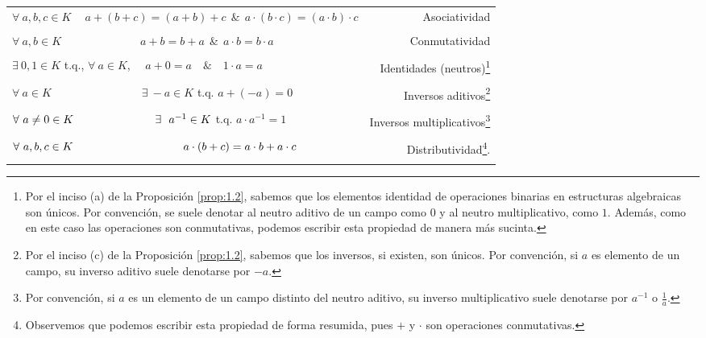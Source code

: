 \documentclass[apuntes]{subfiles}
\begin{document}
\begin{tcolorbox}[breakable]
\begin{center}
\begin{tabular}{lr}
    \\
    $\forall \ a,b,c\in K \quad \ a+(b+c)=(a+b)+c \ \ \& \ \ a\cdot (b\cdot c)=(a\cdot b)\cdot c$ & Asociatividad \\ \\
    $\forall \ a,b\in K \quad \quad \quad \quad \quad \quad \quad a+b=b+a \ \ \& \ \ a\cdot b = b\cdot a$ & Conmutatividad \\ \\
    $\exists \ 0,1\in K$ t.q., $\forall \ a\in K$, \ \ \quad $a+0=a \quad \& \quad 1\cdot a=a$ & Identidades (neutros)\footnote{Por el inciso (a) de la Proposición \ref{prop:1.2}, sabemos que los elementos identidad de operaciones binarias en estructuras algebraicas son únicos. Por convención, se suele denotar al neutro aditivo de un campo como $0$ y al neutro multiplicativo, como $1$. Además, como en este caso las operaciones son conmutativas, podemos escribir esta propiedad de manera más sucinta.} \\ \\
    $\forall \ a\in K \quad \quad \quad \quad \quad \quad \quad \quad \exists \ -a\in K$ \quad t.q. \quad $a + (-a) = 0$ & Inversos aditivos\footnote{Por el inciso (c) de la Proposición \ref{prop:1.2}, sabemos que los inversos, si existen, son únicos. Por convención, si $a$ es elemento de un campo, su inverso aditivo suele denotarse por $-a$.} \\ \\
    $\forall \ a\neq0\in K \hspace{2.55cm} \exists \ \ a^{-1}\in K$ \quad t.q. \quad $a\cdot a^{-1}= 1$ & Inversos multiplicativos\footnote{Por convención, si $a$ es un elemento de un campo distinto del neutro aditivo, su inverso multiplicativo suele denotarse por $a^{-1}$ o $\frac{1}{a}$.} \\ \\
    $\forall \ a,b,c\in K \hspace{3.45cm}a\cdot (b+c) = a\cdot b+a\cdot c$ & Distributividad\footnote{Observemos que podemos escribir esta propiedad de forma resumida, pues $+$ y $\cdot$ son operaciones conmutativas.}.\\ \\
\end{tabular}
\end{center}
\end{tcolorbox}
\end{document}
